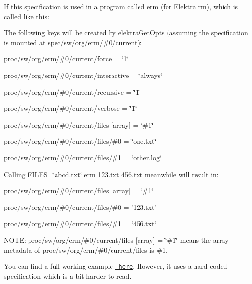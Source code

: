If this specification is used in a program called {\ttfamily erm} (for Elektra rm), which is called like this\+:


\begin{DoxyCode}{0}
\end{DoxyCode}


The following keys will be created by {\ttfamily elektra\+Get\+Opts} (assuming the specification is mounted at {\ttfamily spec/sw/org/erm/\#0/current})\+:


\begin{DoxyItemize}
\item {\ttfamily proc/sw/org/erm/\#0/current/force = \char`\"{}1\char`\"{}}
\item {\ttfamily proc/sw/org/erm/\#0/current/interactive = \char`\"{}always\char`\"{}}
\item {\ttfamily proc/sw/org/erm/\#0/current/recursive = \char`\"{}1\char`\"{}}
\item {\ttfamily proc/sw/org/erm/\#0/current/verbose = \char`\"{}1\char`\"{}}
\item {\ttfamily proc/sw/org/erm/\#0/current/files \mbox{[}array\mbox{]} = \char`\"{}\#1\char`\"{}}
\item {\ttfamily proc/sw/org/erm/\#0/current/files/\#0 = \char`\"{}one.\+txt\char`\"{}}
\item {\ttfamily proc/sw/org/erm/\#0/current/files/\#1 = \char`\"{}other.\+log\char`\"{}}
\end{DoxyItemize}

Calling {\ttfamily F\+I\+L\+ES=\char`\"{}abcd.\+txt\char`\"{} erm 123.\+txt 456.\+txt} meanwhile will result in\+:


\begin{DoxyItemize}
\item {\ttfamily proc/sw/org/erm/\#0/current/files \mbox{[}array\mbox{]} = \char`\"{}\#1\char`\"{}}
\item {\ttfamily proc/sw/org/erm/\#0/current/files/\#0 = \char`\"{}123.\+txt\char`\"{}}
\item {\ttfamily proc/sw/org/erm/\#0/current/files/\#1 = \char`\"{}456.\+txt\char`\"{}}
\end{DoxyItemize}

N\+O\+TE\+: {\ttfamily proc/sw/org/erm/\#0/current/files \mbox{[}array\mbox{]} = \char`\"{}\#1\char`\"{}} means the {\ttfamily array} metadata of {\ttfamily proc/sw/org/erm/\#0/current/files} is {\ttfamily \#1}.

You can find a full working example \href{/home/mpranj/workspace/libelektra/examples/opts.c}{\texttt{ here}}. However, it uses a hard coded specification which is a bit harder to read. 